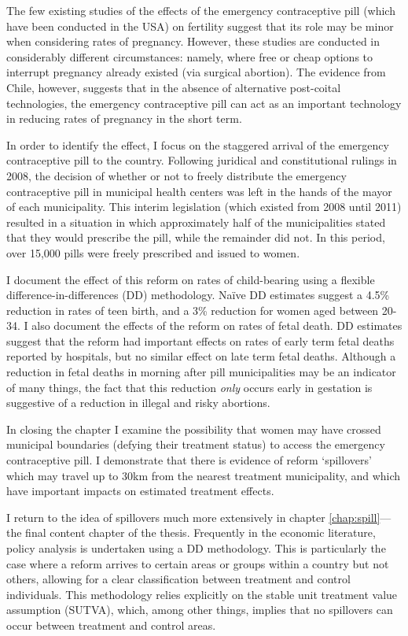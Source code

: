 The few existing studies of the effects of the emergency contraceptive pill
(which have been conducted in the USA) on fertility suggest that its role may be 
minor when considering rates of pregnancy.  However, these studies are conducted 
in considerably different circumstances: namely, where free or cheap options to
interrupt pregnancy already existed (via surgical abortion).  The evidence from 
Chile, however, suggests that in the absence of alternative post-coital 
technologies, the emergency contraceptive pill can act as an important technology 
in reducing rates of pregnancy in the short term.

In order to identify the effect, I focus on the staggered arrival of the 
emergency contraceptive pill to the country. Following juridical and 
constitutional rulings in 2008, the decision of whether or not to freely 
distribute the emergency contraceptive pill in municipal health centers was 
left in the hands of the mayor of each municipality. This interim legislation
(which existed from 2008 until 2011) resulted in a situation in which 
approximately half of the municipalities stated that they would prescribe the 
pill, while the remainder did not. In this period, over 15,000 pills were 
freely prescribed and issued to women.

I document the effect of this reform on rates of child-bearing using a flexible 
difference-in-differences (DD) methodology. Na\"ive DD estimates suggest a 4.5\% 
reduction in rates of teen birth, and a 3\% reduction for women aged between 
20-34.  I also document the effects of the reform on rates of fetal death.  DD 
estimates suggest that the reform had important effects on rates of early term 
fetal deaths reported by hospitals, but no similar effect on late term fetal 
deaths. Although a reduction in fetal deaths in morning after pill 
municipalities may be an indicator of many things, the fact that this reduction
\emph{only} occurs early in gestation is suggestive of a reduction in illegal
and risky abortions.

In closing the chapter I examine the possibility that women may have crossed
municipal boundaries (defying their treatment status) to access the emergency
contraceptive pill. I demonstrate that there is evidence of reform `spillovers'
which may travel up to 30km from the nearest treatment municipality, and which
have important impacts on estimated treatment effects.

I return to the idea of spillovers much more extensively in chapter 
\ref{chap:spill}---the final content chapter of the thesis.  Frequently in the
economic literature, policy analysis is undertaken using a DD methodology. This
is particularly the case where a reform arrives to certain areas or groups 
within a country but not others, allowing for a clear classification between
treatment and control individuals.  This methodology relies explicitly on the
stable unit treatment value assumption (SUTVA), which, among other things,
implies that no spillovers can occur between treatment and control areas.

